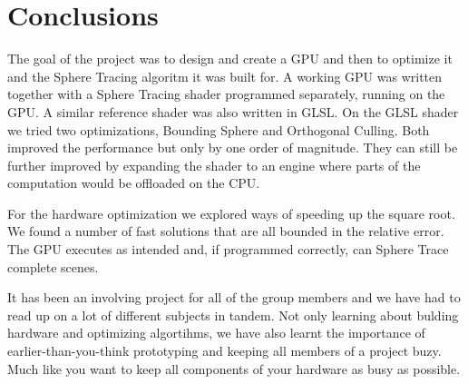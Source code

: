 \chapter{Conclusions}

	The goal of the project was to design and create a GPU and then to optimize
	it and the Sphere Tracing algoritm it was built for. A working GPU was
	written together with a Sphere Tracing shader programmed separately,
	running on the GPU. A similar reference shader was also written in GLSL. On
	the GLSL shader we tried two optimizations, Bounding Sphere and Orthogonal
	Culling. Both improved the performance but only by one order of magnitude.
	They can still be further improved by expanding the shader to an engine
	where parts of the computation would be offloaded on the CPU. 
	
	For the hardware optimization we explored ways of speeding up the square
	root.  We found a number of fast solutions that are all bounded in the
	relative error.  The GPU executes as intended and, if programmed correctly,
	can Sphere Trace complete scenes. 
	
	It has been an involving project for all of the group members and we have
	had to read up on a lot of different subjects in tandem. Not only learning
	about bulding hardware and optimizing algortihms, we have also learnt the
	importance of earlier-than-you-think prototyping and keeping all members of
	a project buzy. Much like you want to keep all components of your hardware
	as busy as possible.
